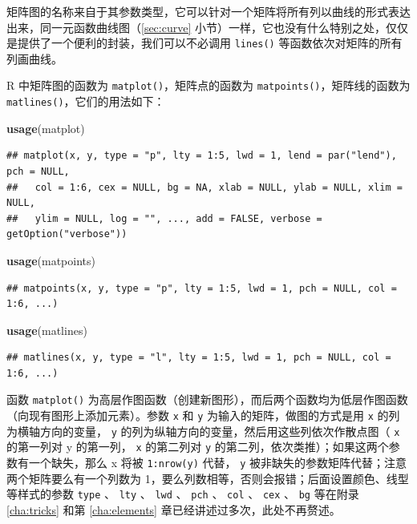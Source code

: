 \documentclass[
  b5paper,
  UTF8,twoside]{book}
\newenvironment{Shaded}{\begin{snugshade}}{\end{snugshade}}
\newcommand{\FunctionTok}[1]{\textcolor[rgb]{0.13,0.29,0.53}{\textbf{#1}}}
\newcommand{\NormalTok}[1]{#1}
\begin{document}
矩阵图的名称来自于其参数类型，它可以针对一个矩阵将所有列以曲线的形式表达出来，同一元函数曲线图（\ref{sec:curve} 小节）一样，它也没有什么特别之处，仅仅是提供了一个便利的封装，我们可以不必调用 \texttt{lines()} 等函数依次对矩阵的所有列画曲线。

R 中矩阵图的函数为 \texttt{matplot()}，矩阵点的函数为 \texttt{matpoints()}，矩阵线的函数为 \texttt{matlines()}，它们的用法如下：

\begin{Shaded}
\begin{Highlighting}[]
\FunctionTok{usage}\NormalTok{(matplot)}
\end{Highlighting}
\end{Shaded}

\begin{verbatim}
## matplot(x, y, type = "p", lty = 1:5, lwd = 1, lend = par("lend"), pch = NULL,
##   col = 1:6, cex = NULL, bg = NA, xlab = NULL, ylab = NULL, xlim = NULL,
##   ylim = NULL, log = "", ..., add = FALSE, verbose = getOption("verbose"))
\end{verbatim}

\begin{Shaded}
\begin{Highlighting}[]
\FunctionTok{usage}\NormalTok{(matpoints)}
\end{Highlighting}
\end{Shaded}

\begin{verbatim}
## matpoints(x, y, type = "p", lty = 1:5, lwd = 1, pch = NULL, col = 1:6, ...)
\end{verbatim}

\begin{Shaded}
\begin{Highlighting}[]
\FunctionTok{usage}\NormalTok{(matlines)}
\end{Highlighting}
\end{Shaded}

\begin{verbatim}
## matlines(x, y, type = "l", lty = 1:5, lwd = 1, pch = NULL, col = 1:6, ...)
\end{verbatim}

函数 \texttt{matplot()} 为高层作图函数（创建新图形），而后两个函数均为低层作图函数（向现有图形上添加元素）。参数 \texttt{x} 和 \texttt{y} 为输入的矩阵，做图的方式是用 \texttt{x} 的列为横轴方向的变量， \texttt{y} 的列为纵轴方向的变量，然后用这些列依次作散点图（ \texttt{x} 的第一列对 y 的第一列， \texttt{x} 的第二列对 \texttt{y} 的第二列，依次类推）；如果这两个参数有一个缺失，那么 x 将被 \texttt{1:nrow(y)} 代替， \texttt{y} 被非缺失的参数矩阵代替；注意两个矩阵要么有一个列数为 1，要么列数相等，否则会报错；后面设置颜色、线型等样式的参数 \texttt{type} 、 \texttt{lty} 、 \texttt{lwd} 、 \texttt{pch} 、 \texttt{col} 、 \texttt{cex} 、 \texttt{bg} 等在附录 \ref{cha:tricks} 和第 \ref{cha:elements} 章已经讲述过多次，此处不再赘述。
\end{document}
